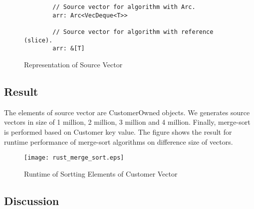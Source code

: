 \begin{figure}[htb]
    \begin{lstlisting}
        // Source vector for algorithm with Arc.
        arr: Arc<VecDeque<T>>

        // Source vector for algorithm with reference (slice).
        arr: &[T]
    \end{lstlisting}
    \caption{Representation of Source Vector}
    \label{fig:Sampling}
\end{figure}


\subsection{Result}
The elements of source vector are CustomerOwned objects. We generates source vectors in size of 1 million, 2 million, 3 million and 4 million. 
Finally, merge-sort is performed based on Customer key value. The figure shows the result for runtime performance of merge-sort algorithms on difference size of vectors.

\begin{figure}[htb]
    \texttt{[image: rust\_merge\_sort.eps]}
    \caption{Runtime of Sortting Elements of Customer Vector}
    \label{fig:Sampling}
\end{figure}

\subsection{Discussion}


